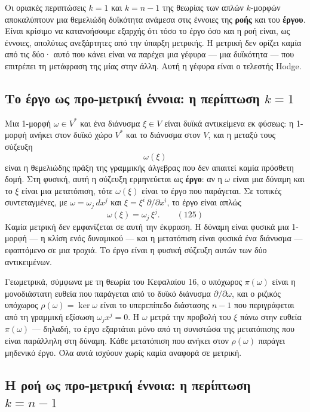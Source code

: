 \documentclass[12pt]{article}
\begin{document}
Οι οριακές περιπτώσεις $k=1$ και $k=n-1$ της θεωρίας των απλών $k$-μορφών αποκαλύπτουν μια θεμελιώδη δυϊκότητα ανάμεσα στις έννοιες της \textbf{ροής} και του \textbf{έργου}. Είναι κρίσιμο να κατανοήσουμε εξαρχής ότι τόσο το έργο όσο και η ροή είναι, ως έννοιες, απολύτως ανεξάρτητες από την ύπαρξη μετρικής. Η μετρική δεν ορίζει καμία από τις δύο· αυτό που κάνει είναι να παρέχει μια γέφυρα — μια δυϊκότητα — που επιτρέπει τη μετάφραση της μίας στην άλλη. Αυτή η γέφυρα είναι ο τελεστής Hodge.

\subsection{Το έργο ως προ-μετρική έννοια: η περίπτωση $k=1$}

Μια 1-μορφή $\omega \in V^*$ και ένα διάνυσμα $\xi \in V$ είναι δυϊκά αντικείμενα εκ φύσεως: η 1-μορφή ανήκει στον δυϊκό χώρο $V^*$ και το διάνυσμα στον $V$, και η μεταξύ τους σύζευξη
\[
\omega(\xi)
\]
είναι η θεμελιώδης πράξη της γραμμικής άλγεβρας που δεν απαιτεί καμία πρόσθετη δομή. Στη φυσική, αυτή η σύζευξη ερμηνεύεται ως \textbf{έργο}: αν η $\omega$ είναι μια δύναμη και το $\xi$ είναι μια μετατόπιση, τότε $\omega(\xi)$ είναι το έργο που παράγεται. Σε τοπικές συντεταγμένες, με $\omega = \omega_j \, dx^j$ και $\xi = \xi^i \, \partial / \partial x^i$, το έργο είναι απλώς
\begin{equation}
\omega(\xi) = \omega_j \, \xi^j. \qquad (125)
\end{equation}
Καμία μετρική δεν εμφανίζεται σε αυτή την έκφραση. Η δύναμη είναι φυσικά μια 1-μορφή — η κλίση ενός δυναμικού — και η μετατόπιση είναι φυσικά ένα διάνυσμα — εφαπτόμενο σε μια τροχιά. Το έργο είναι η φυσική σύζευξη αυτών των δύο αντικειμένων.

Γεωμετρικά, σύμφωνα με τη θεωρία του Κεφαλαίου 16, ο υπόχωρος $\pi(\omega)$ είναι η μονοδιάστατη ευθεία που παράγεται από το δυϊκό διάνυσμα $\partial / \partial \omega$, και ο ριζικός υπόχωρος $\rho(\omega) = \ker \omega$ είναι το υπερεπίπεδο διάστασης $n-1$ που περιγράφεται από τη γραμμική εξίσωση $\omega_j x^j = 0$. Η $\omega$ μετρά την προβολή του $\xi$ πάνω στην ευθεία $\pi(\omega)$ — δηλαδή, το έργο εξαρτάται μόνο από τη συνιστώσα της μετατόπισης που είναι παράλληλη στη δύναμη. Κάθε μετατόπιση που ανήκει στον $\rho(\omega)$ παράγει μηδενικό έργο. Όλα αυτά ισχύουν χωρίς καμία αναφορά σε μετρική.

\subsection{Η ροή ως προ-μετρική έννοια: η περίπτωση $k=n-1$}
\end{document}
